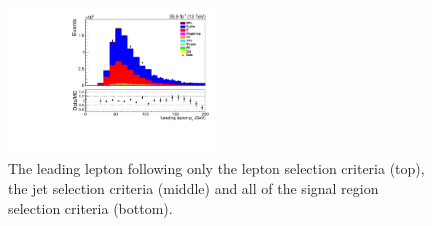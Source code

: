 \begin{figure}[ht]
\includegraphics[width=0.49\textwidth]{figs/background-estimation/plots/unblinded/prompt_mumu_ttbarInc/lep1Pt_NPL_mumu_wMass_mumu.pdf}
\caption{
The leading lepton \pT following only the lepton selection criteria (top), the jet selection criteria (middle) and all of the signal region selection criteria (bottom).
}
\label{fig:SR_lep1Pt}
\end{figure}

